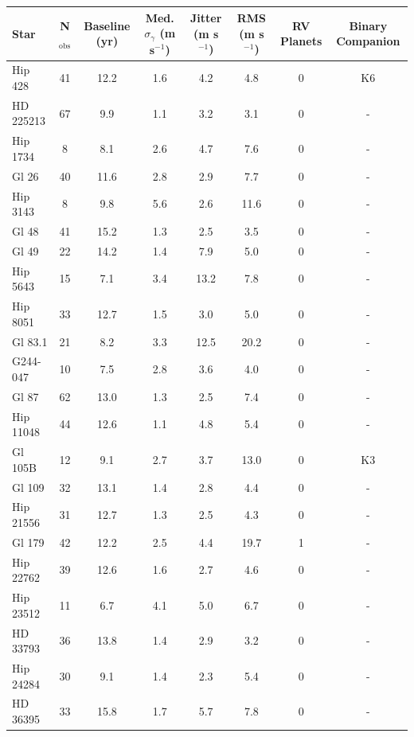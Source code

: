 \clearpage

\begin{landscape}
{\footnotesize
\begin{longtable}{l|ccccccc} 
\hline
Star & N$_\textrm{obs}$ & Baseline (yr) & 
Med. $\sigma_{\gamma}$ (m s$^{-1}$) & Jitter (m s$^{-1}$) & RMS (m s$^{-1}$) & RV Planets & Binary Companion \\
     \hline
Hip 428 &  41 &  12.2 &   1.6 &   4.2 &   4.8 & 0 & K6 \citep{Bidelman54}  \\ 
HD 225213  &  67 &   9.9 &   1.1 &   3.2 &   3.1 & 0 & -  \\ 
Hip 1734  &   8 &   8.1 &   2.6 &   4.7 &   7.6 & 0 & -  \\ 
Gl 26  &  40 &  11.6 &   2.8 &   2.9 &   7.7 & 0 & -  \\ 
Hip 3143  &   8 &   9.8 &   5.6 &   2.6 &  11.6 & 0 & -  \\ 
Gl 48  &  41 &  15.2 &   1.3 &   2.5 &   3.5 & 0 & -  \\ 
Gl 49  &  22 &  14.2 &   1.4 &   7.9 &   5.0 & 0 & -  \\ 
Hip 5643  &  15 &   7.1 &   3.4 &  13.2 &   7.8 & 0 & -  \\ 
Hip 8051  &  33 &  12.7 &   1.5 &   3.0 &   5.0 & 0 & -  \\ 
Gl 83.1  &  21 &   8.2 &   3.3 &  12.5 &  20.2 & 0 & -  \\ 
G244-047  &  10 &   7.5 &   2.8 &   3.6 &   4.0 & 0 & -  \\ 
Gl 87 &  62 &  13.0 &   1.3 &   2.5 &   7.4 & 0 & -  \\ 
Hip 11048  &  44 &  12.6 &   1.1 &   4.8 &   5.4 & 0 & -  \\ 
Gl 105B &  12 &   9.1 &   2.7 &   3.7 &  13.0 & 0 & K3 \citep{Gray06}  \\ 
Gl 109  &  32 &  13.1 &   1.4 &   2.8 &   4.4 & 0 & -  \\ 
Hip 21556  &  31 &  12.7 &   1.3 &   2.5 &   4.3 & 0 & -  \\ 
Gl 179 &  42 &  12.2 &   2.5 &   4.4 &  19.7 & 1 & -  \\ 
Hip 22762  &  39 &  12.6 &   1.6 &   2.7 &   4.6 & 0 & -  \\ 
Hip 23512  &  11 &   6.7 &   4.1 &   5.0 &   6.7 & 0 & -  \\ 
HD 33793  &  36 &  13.8 &   1.4 &   2.9 &   3.2 & 0 & -  \\ 
Hip 24284  &  30 &   9.1 &   1.4 &   2.3 &   5.4 & 0 & -  \\ 
HD 36395  &  33 &  15.8 &   1.7 &   5.7 &   7.8 & 0 & -  \\ 

\end{longtable}}
\end{landscape}
